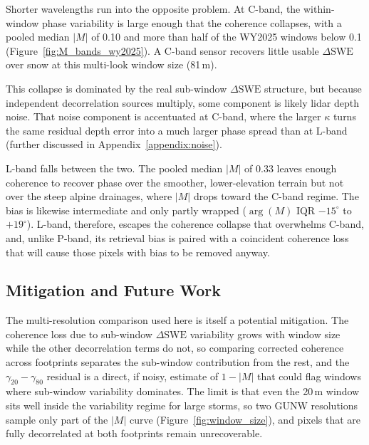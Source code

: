 \documentclass[tc, manuscript]{copernicus}
\begin{document}
Shorter wavelengths run into the opposite problem. At C-band, the within-window phase variability is large enough that the coherence collapses, with a pooled median $|M|$ of 0.10 and more than half of the WY2025 windows below 0.1 (Figure~\ref{fig:M_bands_wy2025}). A C-band sensor recovers little usable $\Delta\mathrm{SWE}$ over snow at this multi-look window size (81\,\unit{m}).

This collapse is dominated by the real sub-window $\Delta\mathrm{SWE}$ structure, but because independent decorrelation sources multiply, some component is likely lidar depth noise. That noise component is accentuated at C-band, where the larger $\kappa$ turns the same residual depth error into a much larger phase spread than at L-band (further discussed in Appendix~\ref{appendix:noise}).

L-band falls between the two. The pooled median $|M|$ of 0.33 leaves enough coherence to recover phase over the smoother, lower-elevation terrain but not over the steep alpine drainages, where $|M|$ drops toward the C-band regime. The bias is likewise intermediate and only partly wrapped ($\arg(M)$ IQR $-15^\circ$ to $+19^\circ$). L-band, therefore, escapes the coherence collapse that overwhelms C-band, and, unlike P-band, its retrieval bias is paired with a coincident coherence loss that will cause those pixels with bias to be removed anyway.

\subsection{Mitigation and Future Work}\label{subsec:mitigation}

The multi-resolution comparison used here is itself a potential mitigation. The coherence loss due to sub-window $\Delta\mathrm{SWE}$ variability grows with window size while the other decorrelation terms do not, so comparing corrected coherence across footprints separates the sub-window contribution from the rest, and the $\gamma_{20}-\gamma_{80}$ residual is a direct, if noisy, estimate of $1-|M|$ that could flag windows where sub-window variability dominates. The limit is that even the 20\,\unit{m} window sits well inside the variability regime for large storms, so two GUNW resolutions sample only part of the $|M|$ curve (Figure~\ref{fig:window_size}), and pixels that are fully decorrelated at both footprints remain unrecoverable.
\end{document}
